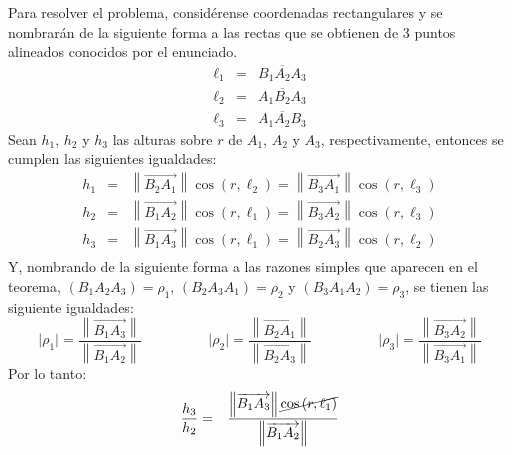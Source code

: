 \begin{solucion}
 Para resolver el problema, consid\'erense coordenadas rectangulares 
 y se nombrar\'an de la siguiente forma a las rectas que
 se obtienen de 3 puntos alineados conocidos por el enunciado.
 \begin{eqnarray*}
  \ell_1 & = & \overline{B_1A_2A_3} \\
  \ell_2 & = & \overline{A_1B_2A_3} \\
  \ell_3 & = & \overline{A_1A_2B_3}
 \end{eqnarray*}
 Sean $h_1$, $h_2$ y $h_3$ las alturas sobre $r$ de $A_1$, $A_2$ y $A_3$,
 respectivamente, entonces se cumplen las siguientes igualdades:
 \begin{eqnarray*}
  h_1 & = &
  \left\lVert \overrightarrow{B_2A_1} \right\rVert
  \cos\left( r, \ell_2 \right)
  = \left\lVert \overrightarrow{B_3A_1} \right\rVert
  \cos\left( r, \ell_3 \right)
  \\
  h_2 & = & 
  \left\lVert \overrightarrow{B_1A_2} \right\rVert
  \cos\left( r, \ell_1 \right)
  = \left\lVert \overrightarrow{B_3A_2} \right\rVert
  \cos\left( r, \ell_3 \right)
  \\
  h_3 & = & 
  \left\lVert \overrightarrow{B_1A_3} \right\rVert
  \cos\left( r, \ell_1 \right)
  = \left\lVert \overrightarrow{B_2A_3} \right\rVert
  \cos\left( r, \ell_2 \right)
  \\
 \end{eqnarray*}
 Y, nombrando de la siguiente forma a las razones simples que aparecen
 en el teorema, $\left( B_1A_2A_3 \right) = \rho_1$,
 $\left( B_2A_3A_1 \right) = \rho_2$
 y $\left( B_3A_1A_2 \right) = \rho_3$,
 se tienen las siguiente igualdades:
 \begin{equation*}
  \lvert \rho_1 \rvert =
  \frac{
  \left\lVert \overrightarrow{B_1A_3} \right\rVert
  }{
  \left\lVert \overrightarrow{B_1A_2} \right\rVert
  } 
  \hspace{2cm}
  \lvert \rho_2 \rvert =
  \frac{
  \left\lVert \overrightarrow{B_2A_1} \right\rVert
  }{
  \left\lVert \overrightarrow{B_2A_3} \right\rVert
  }
  \hspace{2cm}
  \lvert \rho_3 \rvert =
  \frac{
  \left\lVert \overrightarrow{B_3A_2} \right\rVert
  }{
  \left\lVert \overrightarrow{B_3A_1} \right\rVert
  }
 \end{equation*}
 Por lo tanto:
 \begin{eqnarray*}
  \frac{h_3}{h_2} & = &
  \frac{
  \left\lVert \overrightarrow{B_1A_3} \right\rVert
  \cancel{ \cos\left( r, \ell_1 \right) }
  }{
  \left\lVert \overrightarrow{B_1A_2} \right\rVert
}
\end{eqnarray*}
\end{solucion}
